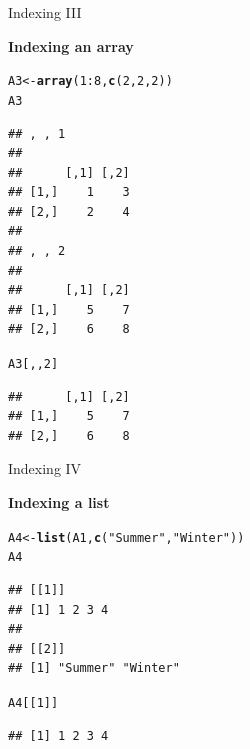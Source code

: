 \documentclass[11pt,german,hideothersubsections]{beamer}\usepackage[]{graphicx}\usepackage[]{color}
\makeatletter
\newcommand{\hlnum}[1]{\textcolor[rgb]{0.686,0.059,0.569}{#1}}%
\newcommand{\hlstr}[1]{\textcolor[rgb]{0.192,0.494,0.8}{#1}}%
\newcommand{\hlopt}[1]{\textcolor[rgb]{0,0,0}{#1}}%
\newcommand{\hlstd}[1]{\textcolor[rgb]{0.345,0.345,0.345}{#1}}%
\newcommand{\hlkwb}[1]{\textcolor[rgb]{0.69,0.353,0.396}{#1}}%
\newcommand{\hlkwd}[1]{\textcolor[rgb]{0.737,0.353,0.396}{\textbf{#1}}}%
\newenvironment{kframe}{%
 \def\at@end@of@kframe{}%
 \ifinner\ifhmode%
  \def\at@end@of@kframe{\end{minipage}}%
  \begin{minipage}{\columnwidth}%
 \fi\fi%
 \def\FrameCommand##1{\hskip\@totalleftmargin \hskip-\fboxsep
 \colorbox{shadecolor}{##1}\hskip-\fboxsep
     \hskip-\linewidth \hskip-\@totalleftmargin \hskip\columnwidth}%
 \MakeFramed {\advance\hsize-\width
   \@totalleftmargin\z@ \linewidth\hsize
   \@setminipage}}%
 {\par\unskip\endMakeFramed%
 \at@end@of@kframe}
\newenvironment{knitrout}{}{} %
\makeatother
\begin{document}
\begin{frame}[fragile]{Indexing III}
\begin{center}
\textbf{Indexing an array}
\end{center}
\begin{scriptsize}
\begin{knitrout}
\color{fgcolor}\begin{kframe}
\begin{alltt}
\hlstd{A3}\hlkwb{<-}\hlkwd{array}\hlstd{(}\hlnum{1}\hlopt{:}\hlnum{8}\hlstd{,}\hlkwd{c}\hlstd{(}\hlnum{2}\hlstd{,}\hlnum{2}\hlstd{,}\hlnum{2}\hlstd{))}
\hlstd{A3}
\end{alltt}
\begin{verbatim}
## , , 1
## 
##      [,1] [,2]
## [1,]    1    3
## [2,]    2    4
## 
## , , 2
## 
##      [,1] [,2]
## [1,]    5    7
## [2,]    6    8
\end{verbatim}
\begin{alltt}
\hlstd{A3[,,}\hlnum{2}\hlstd{]}
\end{alltt}
\begin{verbatim}
##      [,1] [,2]
## [1,]    5    7
## [2,]    6    8
\end{verbatim}
\end{kframe}
\end{knitrout}
\end{scriptsize}
\end{frame}
\begin{frame}[fragile]{Indexing IV}
\begin{center}
\textbf{Indexing a list}
\end{center}
\begin{knitrout}
\color{fgcolor}\begin{kframe}
\begin{alltt}
\hlstd{A4}\hlkwb{<-}\hlkwd{list}\hlstd{(A1,}\hlkwd{c}\hlstd{(}\hlstr{"Summer"}\hlstd{,}\hlstr{"Winter"}\hlstd{))}
\hlstd{A4}
\end{alltt}
\begin{verbatim}
## [[1]]
## [1] 1 2 3 4
## 
## [[2]]
## [1] "Summer" "Winter"
\end{verbatim}
\begin{alltt}
\hlstd{A4[[}\hlnum{1}\hlstd{]]}
\end{alltt}
\begin{verbatim}
## [1] 1 2 3 4
\end{verbatim}
\end{kframe}
\end{knitrout}
\end{frame}
\end{document}
